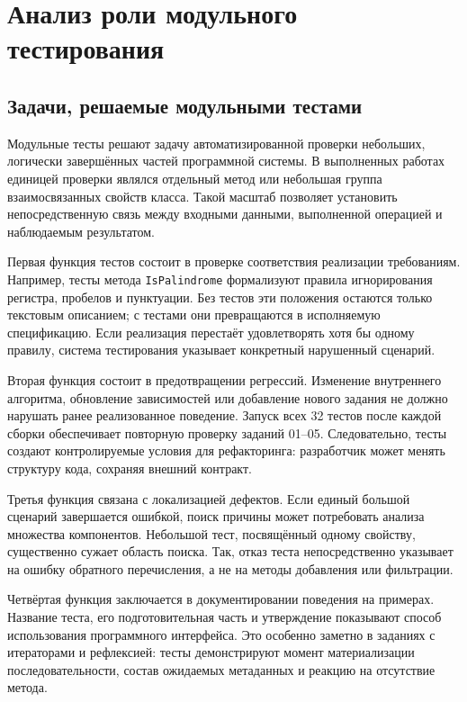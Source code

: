\clearpage
\section{Анализ роли модульного тестирования}

\subsection{Задачи, решаемые модульными тестами}

Модульные тесты решают задачу автоматизированной проверки небольших, логически завершённых частей программной системы. В выполненных работах единицей проверки являлся отдельный метод или небольшая группа взаимосвязанных свойств класса. Такой масштаб позволяет установить непосредственную связь между входными данными, выполненной операцией и наблюдаемым результатом.

Первая функция тестов состоит в проверке соответствия реализации требованиям. Например, тесты метода \texttt{IsPalindrome} формализуют правила игнорирования регистра, пробелов и пунктуации. Без тестов эти положения остаются только текстовым описанием; с тестами они превращаются в исполняемую спецификацию. Если реализация перестаёт удовлетворять хотя бы одному правилу, система тестирования указывает конкретный нарушенный сценарий.

Вторая функция состоит в предотвращении регрессий. Изменение внутреннего алгоритма, обновление зависимостей или добавление нового задания не должно нарушать ранее реализованное поведение. Запуск всех 32 тестов после каждой сборки обеспечивает повторную проверку заданий 01--05. Следовательно, тесты создают контролируемые условия для рефакторинга: разработчик может менять структуру кода, сохраняя внешний контракт.

Третья функция связана с локализацией дефектов. Если единый большой сценарий завершается ошибкой, поиск причины может потребовать анализа множества компонентов. Небольшой тест, посвящённый одному свойству, существенно сужает область поиска. Так, отказ теста  непосредственно указывает на ошибку обратного перечисления, а не на методы добавления или фильтрации.

Четвёртая функция заключается в документировании поведения на примерах. Название теста, его подготовительная часть и утверждение показывают способ использования программного интерфейса. Это особенно заметно в заданиях с итераторами и рефлексией: тесты демонстрируют момент материализации последовательности, состав ожидаемых метаданных и реакцию на отсутствие метода.

